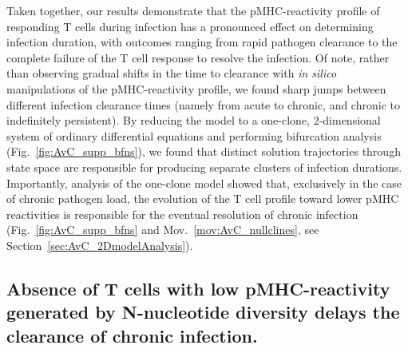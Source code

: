 Taken together, our results demonstrate that the pMHC-reactivity profile of responding T cells during infection has a pronounced effect on determining infection duration, with outcomes ranging from rapid pathogen clearance to the complete failure of the T cell response to resolve the infection. Of note, rather than observing gradual shifts in the time to clearance with \textit{in silico} manipulations of the pMHC-reactivity profile, we found sharp jumps between different infection clearance times (namely from acute to chronic, and chronic to indefinitely persistent). By reducing the model to a one-clone, 2-dimensional system of ordinary differential equations and performing bifurcation analysis (Fig.~\ref{fig:AvC_supp_bfns}), we found that distinct solution trajectories through state space are responsible for producing separate clusters of infection durations. Importantly, analysis of the one-clone model showed that, exclusively in the case of chronic pathogen load, the evolution of the T cell profile toward lower pMHC reactivities is responsible for the eventual resolution of chronic infection (Fig.~\ref{fig:AvC_supp_bfns} and Mov.~\ref{mov:AvC_nullclines}, see Section~\ref{sec:AvC_2DmodelAnalysis}).

\subsection{Absence of T cells with low pMHC-reactivity generated by N-nucleotide diversity delays the clearance of chronic infection.}

